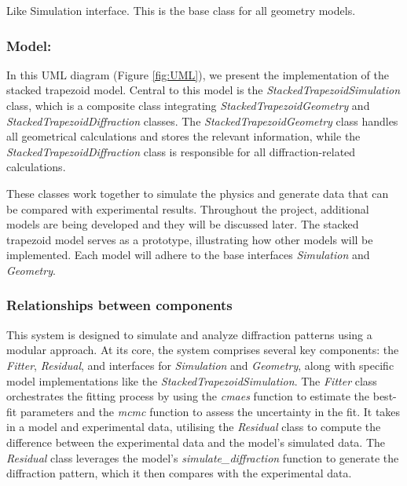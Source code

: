 Like Simulation interface. This is the base class for all geometry models.


\subsubsection*{\textbf{Model:}}

In this UML diagram (Figure \ref{fig:UML}), we present the implementation of the stacked trapezoid model.
 Central to this model is the \textit{StackedTrapezoidSimulation} class, which is a composite class 
 integrating \textit{StackedTrapezoidGeometry} and \textit{StackedTrapezoidDiffraction} classes. The 
 \textit{StackedTrapezoidGeometry} class handles all geometrical calculations and stores the relevant 
 information, while the \textit{StackedTrapezoidDiffraction} class is responsible for all diffraction-related 
 calculations.

 \medskip

These classes work together to simulate the physics and generate data that can be compared with experimental
results. Throughout the project, additional models are being developed and they will be discussed later. The stacked 
trapezoid model serves as a prototype, illustrating how other models will be implemented. Each model will 
adhere to the base interfaces \textit{Simulation} and \textit{Geometry}.

\subsubsection{Relationships between components}

\medskip

This system is designed to simulate and analyze diffraction patterns using
 a modular approach. At its core, the system comprises several key components:
  the \textit{Fitter}, \textit{Residual}, and interfaces for \textit{Simulation}
   and \textit{Geometry}, along with specific model implementations like the
   \textit{StackedTrapezoidSimulation}. The \textit{Fitter} class orchestrates
the fitting process by using the \textit{cmaes} function to estimate the best-fit parameters and
 the \textit{mcmc} function to assess the uncertainty in the fit. It takes in a model and
  experimental data, utilising the \textit{Residual} class to compute the difference between
   the experimental data and the model's simulated data. The \textit{Residual} class leverages
    the model's \textit{simulate\_diffraction} function to generate the diffraction pattern,
     which it then compares with the experimental data.

